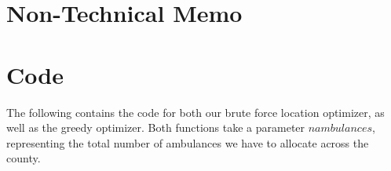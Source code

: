 \documentclass[notitlepage, 12pt]{article}
\begin{document}
\section{Non-Technical Memo}

\appendix
\section{Code}
The following contains the code for both our brute force location optimizer, as well as the greedy optimizer. Both functions take a parameter $nambulances$, representing the total number of ambulances we have to allocate across the county.

\inputminted[fontsize=\footnotesize]{python}{../Code/optimizer.py}






\end{document}
